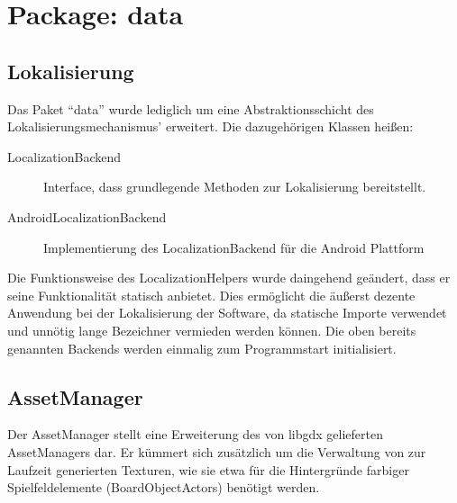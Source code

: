 \section{Package: data}
\subsection{Lokalisierung}
Das Paket "`data"' wurde lediglich um eine Abstraktionsschicht des Lokalisierungsmechanismus' erweitert.
Die dazugehörigen Klassen heißen:
\begin{description}
	\item[LocalizationBackend] Interface, dass grundlegende Methoden zur Lokalisierung bereitstellt.
	\item[AndroidLocalizationBackend] Implementierung des LocalizationBackend für die Android Plattform
\end{description}

Die Funktionsweise des LocalizationHelpers wurde daingehend geändert, dass er seine Funktionalität statisch anbietet.
Dies ermöglicht die äußerst dezente Anwendung bei der Lokalisierung der Software, da statische Importe verwendet und unnötig lange Bezeichner vermieden werden können.
Die oben bereits genannten Backends werden einmalig zum Programmstart initialisiert.


\subsection{AssetManager}
Der AssetManager stellt eine Erweiterung des von libgdx gelieferten AssetManagers dar.
Er kümmert sich zusätzlich um die Verwaltung von zur Laufzeit generierten Texturen, wie sie etwa für die Hintergründe farbiger Spielfeldelemente (BoardObjectActors) benötigt werden.

